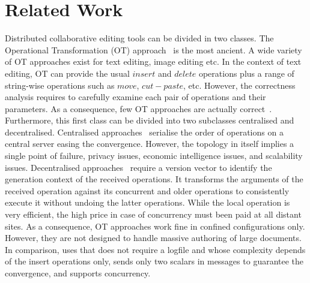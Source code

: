 \section{Related Work}
\label{sec:relatedwork}

Distributed collaborative editing tools can be divided in two classes. The
Operational Transformation (OT) approach~\cite{saito2005optimistic} is the most
ancient. A wide variety of OT approaches exist for text editing, image editing
etc. In the context of text editing, OT can provide the usual $insert$ and
$delete$ operations plus a range of string-wise operations such as $move$,
$cut-paste$, etc. However, the correctness analysis requires to carefully
examine each pair of operations and their parameters. As a consequence, few OT
approaches are actually correct~\cite{imine2003proving}. Furthermore, this
first class can be divided into two subclasses centralised and
decentralised. Centralised approaches~\cite{nichols1995high} serialise the
order of operations on a central server easing the convergence. However, the
topology in itself implies a single point of failure, privacy issues, economic
intelligence issues, and scalability issues. Decentralised
approaches~\cite{sun2009contextbased} require a version vector to identify the
generation context of the received operations. It transforms the arguments of
the received operation against its concurrent and older operations to
consistently execute it without undoing the latter operations. While the local
operation is very efficient, the high price in case of concurrency must been
paid at all distant sites.  As a consequence, OT approaches work fine in
confined configurations only. However, they are not designed to handle massive
authoring of large documents. In comparison, \EDITORNAME{} uses \NAME{} that
does not require a logfile and whose complexity depends of the insert
operations only, sends only two scalars in messages to guarantee the
convergence, and supports concurrency.

